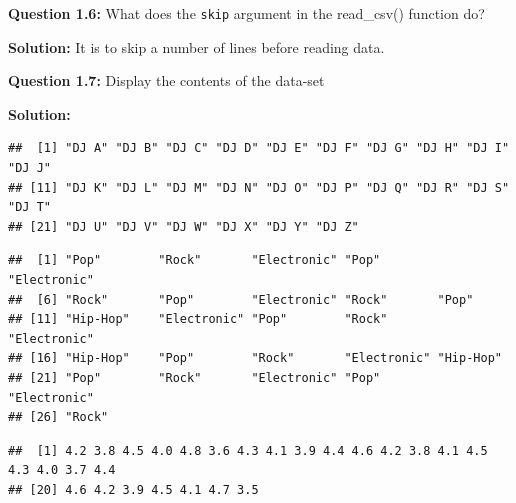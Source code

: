 \documentclass[
]{article}
\newenvironment{Shaded}{\begin{snugshade}}{\end{snugshade}}
\newcommand{\CommentTok}[1]{\textcolor[rgb]{0.56,0.35,0.01}{\textit{#1}}}
\newcommand{\NormalTok}[1]{#1}
\newcommand{\SpecialCharTok}[1]{\textcolor[rgb]{0.81,0.36,0.00}{\textbf{#1}}}
\begin{document}
\textbf{Question 1.6:} What does the \texttt{skip} argument in the
read\_csv() function do?

\textbf{Solution:} It is to skip a number of lines before reading data.

\textbf{Question 1.7:} Display the contents of the data-set

\textbf{Solution:}

\begin{Shaded}
\end{Shaded}

\begin{verbatim}
##  [1] "DJ A" "DJ B" "DJ C" "DJ D" "DJ E" "DJ F" "DJ G" "DJ H" "DJ I" "DJ J"
## [11] "DJ K" "DJ L" "DJ M" "DJ N" "DJ O" "DJ P" "DJ Q" "DJ R" "DJ S" "DJ T"
## [21] "DJ U" "DJ V" "DJ W" "DJ X" "DJ Y" "DJ Z"
\end{verbatim}

\begin{Shaded}
\end{Shaded}

\begin{verbatim}
##  [1] "Pop"        "Rock"       "Electronic" "Pop"        "Electronic"
##  [6] "Rock"       "Pop"        "Electronic" "Rock"       "Pop"       
## [11] "Hip-Hop"    "Electronic" "Pop"        "Rock"       "Electronic"
## [16] "Hip-Hop"    "Pop"        "Rock"       "Electronic" "Hip-Hop"   
## [21] "Pop"        "Rock"       "Electronic" "Pop"        "Electronic"
## [26] "Rock"
\end{verbatim}

\begin{Shaded}
\end{Shaded}

\begin{verbatim}
##  [1] 4.2 3.8 4.5 4.0 4.8 3.6 4.3 4.1 3.9 4.4 4.6 4.2 3.8 4.1 4.5 4.3 4.0 3.7 4.4
## [20] 4.6 4.2 3.9 4.5 4.1 4.7 3.5
\end{verbatim}
\end{document}
